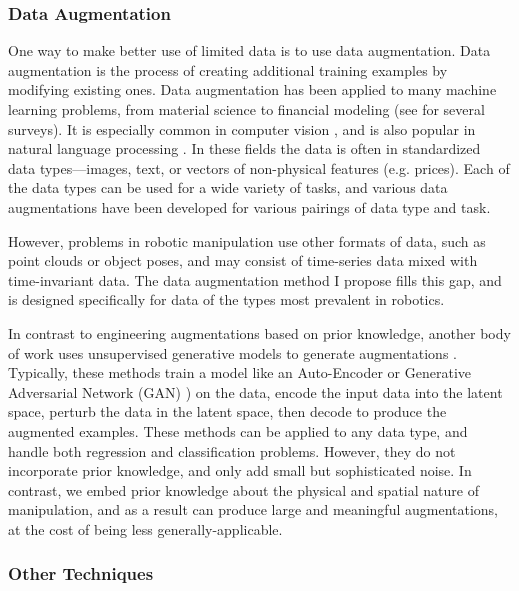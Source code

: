\subsubsection{Data Augmentation}

One way to make better use of limited data is to use data augmentation. Data augmentation is the process of creating additional training examples by modifying existing ones. Data augmentation has been applied to many machine learning problems, from material science \cite{MaterialsAEOhno2020} to financial modeling \cite{PriceForecastingAE2021} (see \cite{TimeSeriesSurveyIwana2020,NLPSurveyFeng2021,ImageAugSurvey2019} for several surveys). It is especially common in computer vision \cite{ImageAugSurvey2019,BestPractice2003,AutoAugment,RLAugLaskin2020,Augerino2020}, and is also popular in natural language processing \cite{NLPSurveyFeng2021,NLPMa2019}. In these fields the data is often in standardized data types---images, text, or vectors of non-physical features (e.g. prices). Each of the data types can be used for a wide variety of tasks, and various data augmentations have been developed for various pairings of data type and task. 

However, problems in robotic manipulation use other formats of data, such as point clouds or object poses, and may consist of time-series data mixed with time-invariant data. The data augmentation method I propose fills this gap, and is designed specifically for data of the types most prevalent in robotics.

In contrast to engineering augmentations based on prior knowledge, another body of work uses unsupervised generative models to generate augmentations \cite{BayesianDATran2017,MaterialsAEOhno2020,PriceForecastingAE2021}. Typically, these methods train a model like an Auto-Encoder or Generative Adversarial Network (GAN) \cite{GANGoodfellow14}) on the data, encode the input data into the latent space, perturb the data in the latent space, then decode to produce the augmented examples. These methods can be applied to any data type, and handle both regression and classification problems. However, they do not incorporate prior knowledge, and only add small but sophisticated noise. In contrast, we embed prior knowledge about the physical and spatial nature of manipulation, and as a result can produce large and meaningful augmentations, at the cost of being less generally-applicable.

\subsubsection{Other Techniques}

